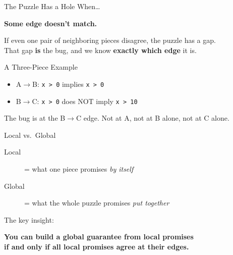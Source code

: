\documentclass[aspectratio=169,10pt]{beamer}
\begin{document}
\begin{frame}{The Puzzle Has a Hole When\ldots}
\begin{center}
\Large\bfseries
Some edge doesn't match.
\end{center}
\vspace{0.5em}
\normalsize
If even one pair of neighboring pieces disagree, the puzzle has a gap.\\[0.3em]
That gap \textbf{is} the bug, and we know \textbf{exactly which edge} it is.
\end{frame}

\begin{frame}{A Three-Piece Example}
\begin{center}
\end{center}
\vspace{0.3em}
\begin{itemize}
  \item A$\to$B: \texttt{x > 0} implies \texttt{x > 0} \textcolor{safe}{\checkmark}
  \item B$\to$C: \texttt{x > 0} does NOT imply \texttt{x > 10} \textcolor{danger}{\texttimes}
\end{itemize}
The bug is at the B$\to$C edge. Not at A, not at B alone, not at C alone.
\end{frame}

\begin{frame}{Local vs.\ Global}
\begin{description}
  \item[Local] = what one piece promises \emph{by itself}
  \item[Global] = what the whole puzzle promises \emph{put together}
\end{description}
\vspace{0.5em}
The key insight:
\begin{center}
\textbf{You can build a global guarantee from local promises\\
if and only if all local promises agree at their edges.}
\end{center}
\end{frame}
\end{document}
